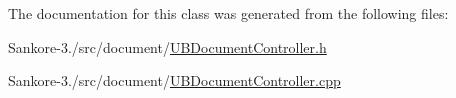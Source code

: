 The documentation for this class was generated from the following files\-:\begin{DoxyCompactItemize}
\item 
Sankore-\/3./src/document/\hyperlink{_u_b_document_controller_8h}{U\-B\-Document\-Controller.\-h}\item 
Sankore-\/3./src/document/\hyperlink{_u_b_document_controller_8cpp}{U\-B\-Document\-Controller.\-cpp}\end{DoxyCompactItemize}
